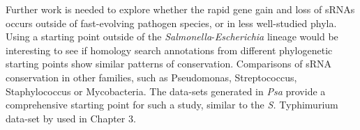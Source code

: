 Further work is needed to explore whether the rapid gene gain and loss of sRNAs occurs outside of fast-evolving pathogen species, or in less well-studied phyla. Using a starting point outside of the \textit{Salmonella}-\textit{Escherichia} lineage would be interesting to see if homology search annotations from different phylogenetic starting points show similar patterns of conservation. Comparisons of sRNA conservation in other families, such as Pseudomonas, Streptococcus, Staphylococcus or Mycobacteria. The data-sets generated in \textit{Psa} provide a comprehensive starting point for such a study, similar to the \textit{S.} Typhimurium data-set by \citep{Kroger2013-pppg} used in Chapter 3.





